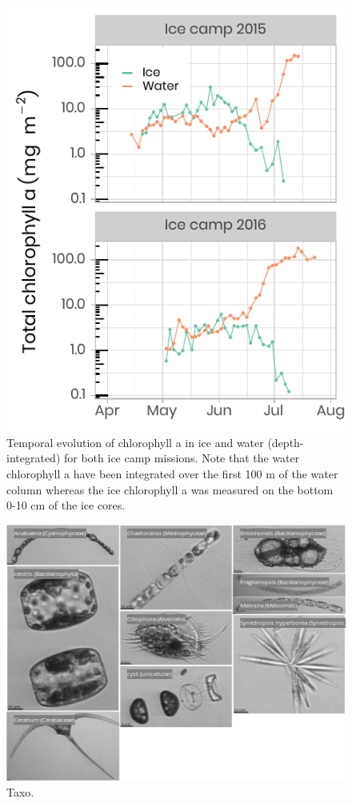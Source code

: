 \documentclass[12pt,a4paper]{scrartcl}
\begin{document}
\begin{figure}[h]
	\centering
	\includegraphics[scale = 2]{../../../graphs/fig7.pdf}
	\caption{Temporal evolution of chlorophyll a in ice and water (depth-integrated) for both ice camp missions. Note that the water chlorophyll a have been integrated over the first 100 m of the water column whereas the ice chlorophyll a was measured on the bottom 0-10 cm of the ice cores.}
\end{figure}

\clearpage
\newpage

\begin{figure}[h]
	\centering
	\includegraphics[scale = 1]{../../../graphs/fig8.png}
	\caption{Taxo.}
\end{figure}
\end{document}
